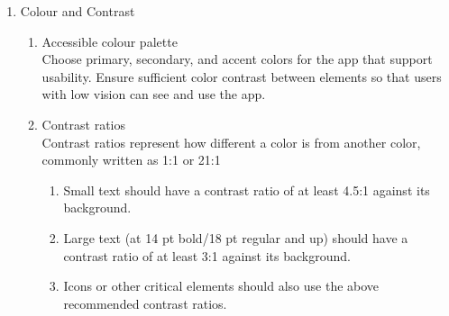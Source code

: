 \documentclass[12pt]{article}
\begin{document}
{{\begin{enumerate}
   		\begin{enumerate}
    		\item{Clear}
            	\begin{enumerate}
                	\item{Clearly visible elements}
                    \item{Sufficient contrast and size}
                    \item{A clear hierarchy of importance}
                    \item{Key information discernable at a glance}
            	\end{enumerate}
        	\item{Robust}
            	\begin{enumerate}
                	\item{Navigate: Give users confidence in knowing where they are in the app and what is important.}
                    \item{Understand important tasks: Reinforce important information through multiple visual and textual cues. Use color, shape, text, and motion to communicate what is happening.}
                    \item{Access the app: Include appropriate content labelling to accommodate users who experience a text-only version of your app.}
            	\end{enumerate}
        	\item{Specific}
            Assistive technology helps increase, maintain, or improve the functional capabilities of individuals with disabilities, through devices like screen readers, magnification devices. This is especially the case with IoT Homecare.
        \end{enumerate}
   \item Colour and Contrast
     \begin{enumerate}
       \item Accessible colour palette\\
       Choose primary, secondary, and accent colors for the app that support usability. Ensure sufficient color contrast between elements so that users with low vision can see and use the app.

       \item Contrast ratios \\
       Contrast ratios represent how different a color is from another color, commonly written as 1:1 or 21:1
       \begin{enumerate}
         \item Small text should have a contrast ratio of at least 4.5:1 against its background.
         \item Large text (at 14 pt bold/18 pt regular and up) should have a contrast ratio of at least 3:1 against its background.
         \item Icons or other critical elements should also use the above recommended contrast ratios.


\end{enumerate}
\end{enumerate}
\end{enumerate}}}
\end{document}
